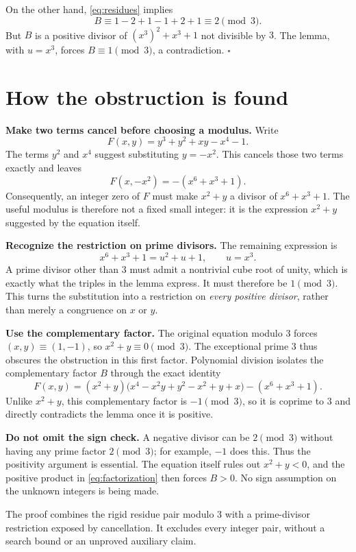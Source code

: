 \documentclass[11pt,a4paper]{article}
\begin{document}
On the other hand, \eqref{eq:residues} implies
\[
 B\equiv1-2+1-1+2+1\equiv2\pmod3.
\]
But $B$ is a positive divisor of $(x^3)^2+x^3+1$ not divisible by $3$.
The lemma, with $u=x^3$, forces $B\equiv1\pmod3$, a contradiction.
\hfill$\square$

\newpage
\section*{How the obstruction is found}

\textbf{Make two terms cancel before choosing a modulus.}
Write
\[
 F(x,y)=y^3+y^2+xy-x^4-1.
\]
The terms $y^2$ and $x^4$ suggest substituting $y=-x^2$. This cancels
those two terms exactly and leaves
\[
 F(x,-x^2)=-(x^6+x^3+1).
\]
Consequently, an integer zero of $F$ must make $x^2+y$ a divisor of
$x^6+x^3+1$. The useful modulus is therefore not a fixed small integer:
it is the expression $x^2+y$ suggested by the equation itself.

\textbf{Recognize the restriction on prime divisors.}
The remaining expression is
\[
 x^6+x^3+1=u^2+u+1,\qquad u=x^3.
\]
A prime divisor other than $3$ must admit a nontrivial cube root of
unity, which is exactly what the triples in the lemma express.
It must therefore be $1\pmod3$. This turns the substitution into a
restriction on \emph{every positive divisor}, rather than merely a
congruence on $x$ or $y$.

\textbf{Use the complementary factor.}
The original equation modulo $3$ forces $(x,y)\equiv(1,-1)$, so
$x^2+y\equiv0\pmod3$. The exceptional prime $3$ thus obscures the
obstruction in this first factor. Polynomial division isolates the
complementary factor $B$ through the exact identity
\[
 F(x,y)=(x^2+y)
 \bigl(x^4-x^2y+y^2-x^2+y+x\bigr)-(x^6+x^3+1).
\]
Unlike $x^2+y$, this complementary factor is $-1\pmod3$, so it is
coprime to $3$ and directly contradicts the lemma once it is positive.

\textbf{Do not omit the sign check.}
A negative divisor can be $2\pmod3$ without having any prime factor
$2\pmod3$; for example, $-1$ does this. Thus the positivity argument is
essential. The equation itself rules out $x^2+y<0$, and the positive
product in \eqref{eq:factorization} then forces $B>0$. No sign assumption
on the unknown integers is being made.

The proof combines the rigid residue pair modulo $3$ with a
prime-divisor restriction exposed by cancellation. It excludes every
integer pair, without a search bound or an unproved auxiliary claim.
\end{document}
